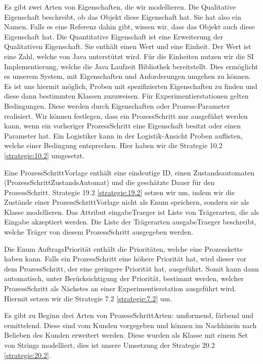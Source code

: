 \documentclass[enabledeprecatedfontcommands,fontsize=12pt,paper=a4,twoside]{scrartcl}
\begin{document}
{Es gibt zwei Arten von Eigenschaften, die wir modellieren. Die Qualitative
Eigenschaft beschreibt, ob das Objekt diese Eigenschaft hat. Sie hat also ein
Namen. Falls es eine Referenz dahin gibt, wissen wir, dass das Objekt auch diese
Eigenschaft hat. Die Quantitative Eigenschaft ist eine Erweiterung der
Qualitativen Eigenschaft. Sie enthält einen Wert und eine Einheit. Der Wert ist
eine Zahl, welche von Java unterstützt wird. Für die Einheiten nutzen wir die SI
Implementierung, welche die Java Laufzeit Bibliothek bereitstellt.
Dies ermöglicht es unserem System, mit Eigenschaften und Anforderungen umgehen zu
können. Es ist uns hiermit möglich, Proben mit spezifizierten Eigenschaften zu
finden und diese dann bestimmten Klassen zuzuweisen. Für Experimentierstationen gelten
Bedingungen. Diese werden durch Eigenschaften oder Prozess-Parameter realisiert.
Wir können festlegen, dass ein ProzessSchritt nur ausgeführt werden kann, wenn
ein vorheriger ProzessSchritt eine Eigenschaft besitzt oder einen Parameter hat.
Ein Logistiker kann in der Logistik-Ansicht Proben auflisten, welche
einer Bedingung entsprechen. Hier haben wir die Strategie 10.2 \ref{strategie:10.2} umgesetzt.

Eine ProzessSchrittVorlage enthält eine eindeutige ID, einen Zustandsautomaten
(ProzessSchrittZustandsAutomat) und die geschätzte Dauer für den ProzessSchritt.
Strategie 19.2 \ref{strategie:19.2} setzen wir um, indem wir die Zustände einer ProzessSchrittVorlage
nicht als Enum speichern, sondern sie als Klasse modellieren.
Das Attribut eingabeTraeger ist Liste von Trägerarten, die als Eingabe akzeptiert
werden. Die Liste der Trägerarten ausgabeTraeger beschreibt, welche Träger von
diesem ProzessSchritt ausgegeben werden.

Die Enum AuftragsPriorität enthält die Prioritäten, welche eine Prozesskette
haben kann. Falls ein ProzessSchritt eine höhere Priorität hat, wird dieser vor
dem ProzessSchritt, der eine geringere Priorität hat, ausgeführt. Somit kann dann
automatisch, unter Berücksichtigung der Priorität, bestimmt werden, welcher ProzessSchritt als Nächstes an einer
Experimentierstation ausgeführt wird.
Hiermit setzen wir die Strategie 7.2 \ref{strategie:7.2} um.

Es gibt zu Beginn drei Arten von ProzessSchrittArten: umformend, färbend und ermittelend. Diese sind vom Kunden vorgegeben und können im Nachhinein nach Belieben des Kunden erweitert werden.
Diese wurden als Klasse mit einem Set von Strings modelliert, dies ist unsere Umsetzung der Strategie 20.2 \ref{strategie:20.2}.

}
\end{document}
